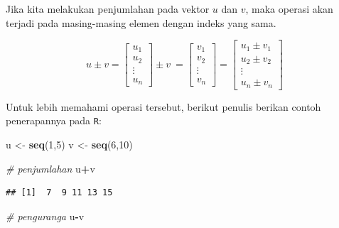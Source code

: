 \documentclass[]{book}
\newenvironment{Shaded}{\begin{snugshade}}{\end{snugshade}}
\newcommand{\CommentTok}[1]{\textcolor[rgb]{0.56,0.35,0.01}{\textit{#1}}}
\newcommand{\DecValTok}[1]{\textcolor[rgb]{0.00,0.00,0.81}{#1}}
\newcommand{\KeywordTok}[1]{\textcolor[rgb]{0.13,0.29,0.53}{\textbf{#1}}}
\newcommand{\NormalTok}[1]{#1}
\newcommand{\OperatorTok}[1]{\textcolor[rgb]{0.81,0.36,0.00}{\textbf{#1}}}
\newcommand{\StringTok}[1]{\textcolor[rgb]{0.31,0.60,0.02}{#1}}
\theoremstyle{definition}
\theoremstyle{definition}
\theoremstyle{definition}
\theoremstyle{remark}
\begin{document}
Jika kita melakukan penjumlahan pada vektor \(u\) dan \(v\), maka operasi akan terjadi pada masing-masing elemen dengan indeks yang sama.

\begin{equation}
u \pm v = \begin{bmatrix}
      u_1            \\[0.3em]
      u_2            \\[0.3em]
      \vdots         \\[0.3em] 
      u_n
     \end{bmatrix}
\pm v\ = \begin{bmatrix}
      v_1            \\[0.3em]
      v_2            \\[0.3em]
      \vdots         \\[0.3em] 
      v_n
     \end{bmatrix}
= \begin{bmatrix}
      u_1 \pm v_1            \\[0.3em]
      u_2 \pm v_2           \\[0.3em]
      \vdots         \\[0.3em] 
      u_n \pm v_n
     \end{bmatrix}
     \label{eq:addvector2}
\end{equation}

Untuk lebih memahami operasi tersebut, berikut penulis berikan contoh penerapannya pada \texttt{R}:

\begin{Shaded}
\begin{Highlighting}[]
\NormalTok{u <-}\StringTok{ }\KeywordTok{seq}\NormalTok{(}\DecValTok{1}\NormalTok{,}\DecValTok{5}\NormalTok{)}
\NormalTok{v <-}\StringTok{ }\KeywordTok{seq}\NormalTok{(}\DecValTok{6}\NormalTok{,}\DecValTok{10}\NormalTok{)}

\CommentTok{# penjumlahan}
\NormalTok{u}\OperatorTok{+}\NormalTok{v}
\end{Highlighting}
\end{Shaded}

\begin{verbatim}
## [1]  7  9 11 13 15
\end{verbatim}

\begin{Shaded}
\begin{Highlighting}[]
\CommentTok{# penguranga}
\NormalTok{u}\OperatorTok{-}\NormalTok{v}
\end{Highlighting}
\end{Shaded}
\end{document}

